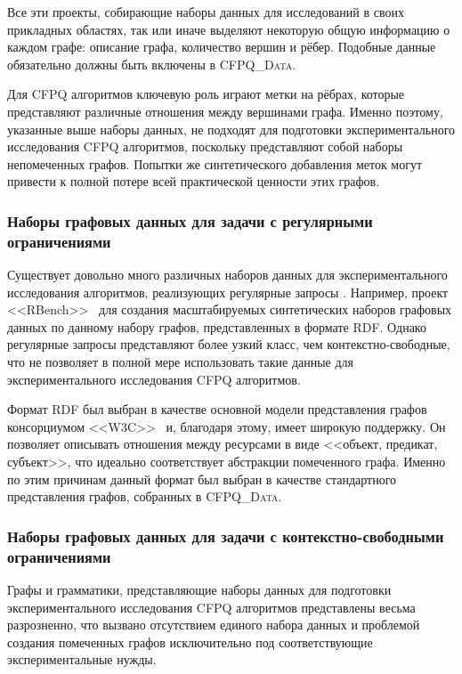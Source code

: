 Все эти проекты, собирающие наборы данных для исследований в своих прикладных областях, так или иначе выделяют некоторую общую информацию о каждом графе: описание графа, количество вершин и рёбер.
Подобные данные обязательно должны быть включены в \textsc{CFPQ\_Data}.

Для CFPQ алгоритмов ключевую роль играют метки на рёбрах, которые представляют различные отношения между вершинами графа.
Именно поэтому, указанные выше наборы данных, не подходят для подготовки экспериментального исследования CFPQ алгоритмов, поскольку представляют собой наборы непомеченных графов.
Попытки же синтетического добавления меток могут привести к полной потере всей практической ценности этих графов.

\subsubsection{Наборы графовых данных для задачи с регулярными ограничениями}

Существует довольно много различных наборов данных для экспериментального исследования алгоритмов, реализующих регулярные запросы \cite{RBench, GSCALER, gMark}.
Например, проект <<RBench>>~\cite{RBench} для создания масштабируемых синтетических наборов графовых данных по данному набору графов, представленных в формате RDF.
Однако регулярные запросы представляют более узкий класс, чем контекстно-свободные, что не позволяет в полной мере использовать такие данные для экспериментального исследования CFPQ алгоритмов.

Формат RDF был выбран в качестве основной модели представления графов консорциумом <<W3C>>~\cite{SEMANTICWEB} и, благодаря этому, имеет широкую поддержку.
Он позволяет описывать отношения между ресурсами в виде <<объект, предикат, субъект>>, что идеально соответствует абстракции помеченного графа.
Именно по этим причинам данный формат был выбран в качестве стандартного представления графов, собранных в \textsc{CFPQ\_Data}.

\subsubsection{Наборы графовых данных для задачи с кон\-текст\-но-свобод\-ны\-ми ограничениями}

Графы и грамматики, представляющие наборы данных для подготовки экспериментального исследования CFPQ алгоритмов представлены весьма разрозненно, что вызвано отсутствием единого набора данных и проблемой создания помеченных графов исключительно под соответствующие экспериментальные нужды.

